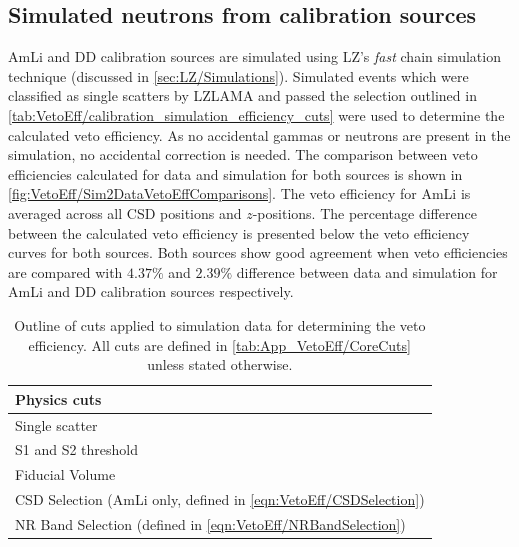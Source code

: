 \subsection{Simulated neutrons from calibration sources}
AmLi and DD calibration sources are simulated using LZ's \textit{fast} chain simulation technique (discussed in \autoref{sec:LZ/Simulations}). Simulated events which were classified as single scatters by LZLAMA and passed the selection outlined in \autoref{tab:VetoEff/calibration_simulation_efficiency_cuts} were used to determine the calculated veto efficiency.
As no accidental gammas or neutrons are present in the simulation, no accidental correction is needed.
The comparison between veto efficiencies calculated for data and simulation for both sources is shown in \autoref{fig:VetoEff/Sim2DataVetoEffComparisons}. The veto efficiency for AmLi is averaged across all CSD positions and $z$-positions. The percentage difference between the calculated veto efficiency is presented below the veto efficiency curves for both sources. Both sources show good agreement when veto efficiencies are compared with $4.37\%$ and $2.39\%$ difference between data and simulation for AmLi and DD calibration sources respectively.
\begin{table}[!ht]
	\centering
	\caption{Outline of cuts applied to simulation data for determining the veto efficiency. All cuts are defined in \autoref{tab:App_VetoEff/CoreCuts} unless stated otherwise.}
	\begin{tabular}{l}
        \hline\hline
        \textbf{Physics cuts}\\
        \hline
        Single scatter\\
        S1 and S2 threshold\\
        Fiducial Volume\\
        CSD Selection (AmLi only, defined in \autoref{eqn:VetoEff/CSDSelection})\\
        NR Band Selection (defined in \autoref{eqn:VetoEff/NRBandSelection})\\
        \hline\hline
	\end{tabular}
	\label{tab:VetoEff/calibration_simulation_efficiency_cuts}
\end{table}

